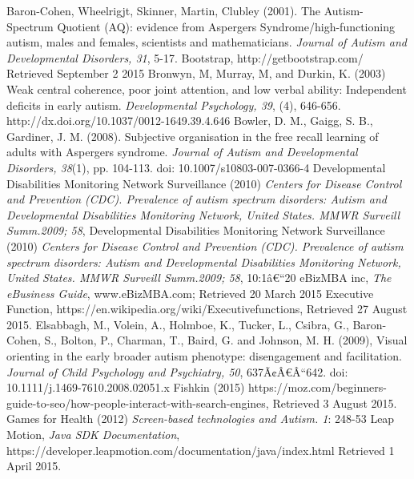 \documentclass[a4paper, 11pt]{article}
\begin{document}
\clearpage
\begin{thebibliography}{100}

 Baron-Cohen, Wheelrigjt, Skinner, Martin, Clubley (2001).  The Autism-Spectrum Quotient (AQ): evidence from Aspergers Syndrome/high-functioning autism, males and females, scientists and mathematicians.  \textit{Journal of Autism and Developmental Disorders, 31}, 5-17.
Bootstrap, http://getbootstrap.com/ Retrieved September 2 2015
 Bronwyn, M, Murray, M, and Durkin, K. (2003) Weak central coherence, poor joint attention, and low verbal ability: Independent deficits in early autism. \textit{Developmental Psychology, 39}, (4), 646-656. http://dx.doi.org/10.1037/0012-1649.39.4.646
 Bowler, D. M., Gaigg, S. B., Gardiner, J. M. (2008). Subjective organisation in the free recall learning of adults with Aspergers syndrome. \textit{Journal of Autism and Developmental Disorders, 38}(1), pp. 104-113. doi: 10.1007/s10803-007-0366-4 
Developmental Disabilities Monitoring Network Surveillance (2010) \textit{Centers for Disease Control and Prevention (CDC). Prevalence of autism spectrum disorders: Autism and Developmental Disabilities Monitoring Network, United States. MMWR Surveill Summ.2009; 58},
Developmental Disabilities Monitoring Network Surveillance (2010) \textit{Centers for Disease Control and Prevention (CDC). Prevalence of autism spectrum disorders: Autism and Developmental Disabilities Monitoring Network, United States. MMWR Surveill Summ.2009; 58}, 10:1â€“20
eBizMBA inc, \textit{The eBusiness Guide}, www.eBizMBA.com; Retrieved 20 March 2015
 Executive Function, https://en.wikipedia.org/wiki/Executivefunctions, Retrieved 27 August 2015.
Elsabbagh, M., Volein, A., Holmboe, K., Tucker, L., Csibra, G., Baron-Cohen, S., Bolton, P., Charman, T., Baird, G. and Johnson, M. H. (2009), Visual orienting in the early broader autism phenotype: disengagement and facilitation. \textit{Journal of Child Psychology and Psychiatry, 50}, 637Ã¢Â€Â“642. doi: 10.1111/j.1469-7610.2008.02051.x
 Fishkin (2015) https://moz.com/beginners-guide-to-seo/how-people-interact-with-search-engines, Retrieved 3 August 2015.
 Games for Health (2012) \textit{Screen-based technologies and Autism. 1}: 248-53
 Leap Motion, \textit{Java SDK Documentation}, \\https://developer.leapmotion.com/documentation/java/index.html Retrieved 1 April 2015.

\end{thebibliography}
\end{document}
